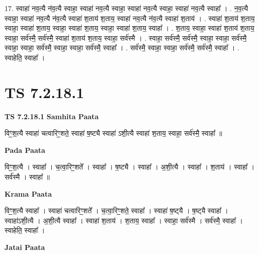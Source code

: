 \documentclass[17pt]{extarticle}
\begin{document}
17. स्वाहा॑ नव॒त्यै न॑व॒त्यै स्वाहा॒ स्वाहा॑ नव॒त्यै स्वाहा॒ स्वाहा॑ नव॒त्यै स्वाहा॒ स्वाहा॑ नव॒त्यै स्वाहा᳚ । . न॒व॒त्यै स्वाहा॒ स्वाहा॑ नव॒त्यै न॑व॒त्यै स्वाहा॑ श॒ताय॑ श॒ताय॒ स्वाहा॑ नव॒त्यै न॑व॒त्यै स्वाहा॑ श॒ताय॑ । . स्वाहा॑ श॒ताय॑ श॒ताय॒ स्वाहा॒ स्वाहा॑ श॒ताय॒ स्वाहा॒ स्वाहा॑ श॒ताय॒ स्वाहा॒ स्वाहा॑ श॒ताय॒ स्वाहा᳚ । . श॒ताय॒ स्वाहा॒ स्वाहा॑ श॒ताय॑ श॒ताय॒ स्वाहा॒ सर्व॑स्मै॒ सर्व॑स्मै॒ स्वाहा॑ श॒ताय॑ श॒ताय॒ स्वाहा॒ सर्व॑स्मै । . स्वाहा॒ सर्व॑स्मै॒ सर्व॑स्मै॒ स्वाहा॒ स्वाहा॒ सर्व॑स्मै॒ स्वाहा॒ स्वाहा॒ सर्व॑स्मै॒ स्वाहा॒ स्वाहा॒ सर्व॑स्मै॒ स्वाहा᳚ । . सर्व॑स्मै॒ स्वाहा॒ स्वाहा॒ सर्व॑स्मै॒ सर्व॑स्मै॒ स्वाहा᳚ । . स्वाहेति॒ स्वाहा᳚ । \newline
\pagebreak
{}

\section{ TS 7.2.18.1 }

\textbf{TS 7.2.18.1 } \newline
\textbf{Samhita Paata} \newline

विꣳ॒॒श॒त्यै स्वाहा॑ चत्वारिꣳ॒॒शते॒ स्वाहा॑ ष॒ष्ट्यै स्वाहा॑ ऽशी॒त्यै स्वाहा॑ श॒ताय॒ स्वाहा॒ सर्व॑स्मै॒ स्वाहा᳚ ॥ \newline

\textbf{Pada Paata} \newline

विꣳ॒॒श॒त्यै । स्वाहा᳚ । च॒त्वा॒रिꣳ॒॒शते᳚ । स्वाहा᳚ । ष॒ष्ट्यै । स्वाहा᳚ । अ॒शी॒त्यै । स्वाहा᳚ । श॒ताय॑ । स्वाहा᳚ । सर्व॑स्मै । स्वाहा᳚ ॥  \newline


\textbf{Krama Paata} \newline

विꣳ॒॒श॒त्यै स्वाहा᳚ । स्वाहा॑ चत्वारिꣳ॒॒शते᳚ । च॒त्वा॒रिꣳ॒॒शते॒ स्वाहा᳚ । स्वाहा॑ ष॒ष्ट्‍यै । ष॒ष्ट्‍यै स्वाहा᳚ । स्वाहा॑ऽशी॒त्यै । अ॒शी॒त्यै स्वाहा᳚ । स्वाहा॑ श॒ताय॑ । श॒ताय॒ स्वाहा᳚ । स्वाहा॒ सर्व॑स्मै । सर्व॑स्मै॒ स्वाहा᳚ । स्वाहेति॒ स्वाहा᳚ । \newline

\textbf{Jatai Paata} \newline
\end{document}
